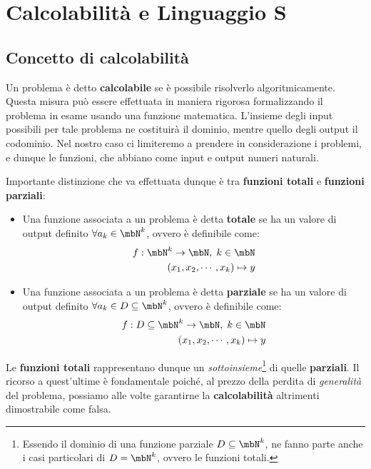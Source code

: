 \chapter{Calcolabilità e Linguaggio S}\label{chapter 1}
\section{Concetto di calcolabilità}

Un problema è detto \textbf{calcolabile} se è possibile risolverlo algoritmicamente.
Questa misura può essere effettuata in maniera rigorosa formalizzando il problema in esame usando una funzione matematica. L'insieme degli input possibili per tale problema ne costituirà il dominio, mentre quello degli output il codominio.
Nel nostro caso ci limiteremo a prendere in considerazione i problemi, e dunque le funzioni, che abbiano come input e output numeri naturali.

Importante distinzione che va effettuata dunque è tra \textbf{funzioni totali}  e \textbf{funzioni parziali}:

\begin{itemize}
  \item Una funzione associata a un problema è detta \textbf{totale} se ha un valore di output definito \(\forall a_k \in \mbN^k\), ovvero è definibile come:
  \begin{equation}
    \begin{split}
    f: \mbN^k\rightarrow\mbN,\; k\in\mbN\\
    (x_1,x_2,\cdots,x_k)\mapsto y
    \end{split}
    \label{Funzione totale Eq}
  \end{equation}

  \item Una funzione associata a un problema è detta \textbf{parziale} se ha un valore di output definito \(\forall a_k \in D\subseteq \mbN^k\), ovvero è definibile come:
  \begin{equation}
    \begin{split}
    f: D\subseteq\mbN^k\rightarrow\mbN,\; k\in\mbN\\
    (x_1,x_2,\cdots,x_k)\mapsto y
    \end{split}
    \label{Funzione parziale Eq}
  \end{equation}
\end{itemize}

Le \textbf{funzioni totali} rappresentano dunque un \textit{sottoinsieme}\footnote{Essendo il dominio di una funzione parziale \(D\subseteq\mbN^k\), ne fanno parte anche i casi particolari di \(D=\mbN^k\), ovvero le funzioni totali.} di quelle \textbf{parziali}.
Il ricorso a quest'ultime è fondamentale poiché, al prezzo della perdita di \textit{generalità} del problema, possiamo alle volte garantirne la \textbf{calcolabilità} altrimenti dimostrabile come falsa.

